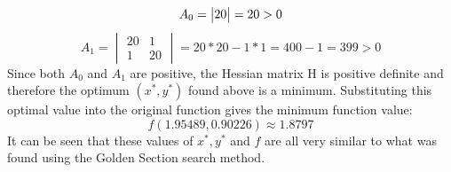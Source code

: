 \documentclass{article}
\begin{document}
\begin{equation*}
    A_{0} = \begin{vmatrix} 20 \end{vmatrix} = 20 > 0\\
\end{equation*}
\begin{equation*}
    A_{1} =\begin{vmatrix} 20 & 1 \\ 1 & 20 \end{vmatrix} = 20*20 - 1*1 = 400 - 1 = 399 > 0
\end{equation*}
Since both $A_{0}$ and $A_{1}$ are positive, the Hessian matrix H is positive definite and therefore the optimum $(x^{*}, y^{*})$ found above is a minimum. Substituting this optimal value into the original function gives the minimum function value:
\begin{equation*}
    f(1.95489, 0.90226) \approx 1.8797
\end{equation*}
It can be seen that these values of $x^{*}, y^{*}$ and $f$ are all very similar to what was found using the Golden Section search method.



\end{document}
